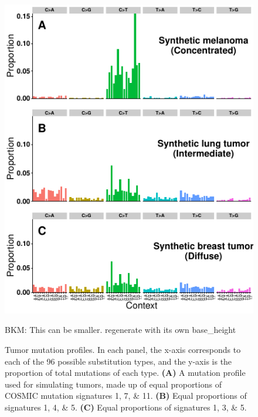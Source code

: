 \documentclass[a4,center,fleqn]{NAR}
\newcommand{\bkmcomment}[1]{{\color{blue}BKM: #1}}
\begin{document}
\begin{figure}
  \begin{center}
  \includegraphics{figures/sim_signatures_only.pdf}
  \end{center}
  \bkmcomment{This can be smaller. regenerate with its own base\_height}
  \caption{Tumor mutation profiles.
  In each panel, the x-axis corresponds to each of the 96 possible substitution types, and the y-axis is the proportion of total mutations of each type.
  \textbf{(A)} A mutation profile used for simulating tumors, made up of equal proportions of COSMIC mutation signatures 1, 7, \& 11.
  \textbf{(B)} Equal proportions of signatures 1, 4, \& 5.
  \textbf{(C)} Equal proportions of signatures 1, 3, \& 5.
   }
  \label{NAR-simsigfig}
 \end{figure}
\end{document}
